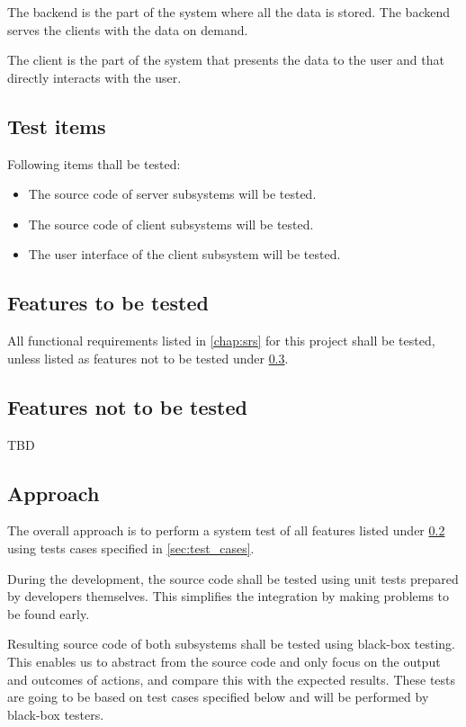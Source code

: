 \documentclass[11pt]{book}
\begin{document}
The backend is the part of the system where all the data is stored. The backend serves the clients with the data on demand.

The client is the part of the system that presents the data to the user and that directly interacts with the user.

\subsection{Test items}
Following items thall be tested:

\begin{itemize}
	\item The source code of server subsystems will be tested.
	\item The source code of client subsystems will be tested.
	\item The user interface of the client subsystem will be tested.
\end{itemize}

\subsection{Features to be tested} \label{sec:test_plan_featurestested}
All functional requirements listed in \ref{chap:srs} for this project shall be tested, unless listed as features not to be tested under \ref{sec:test_plan_featuresnottested}.

\subsection{Features not to be tested} \label{sec:test_plan_featuresnottested}
TBD

\subsection{Approach}
The overall approach is to perform a system test of all features listed under \ref{sec:test_plan_featurestested} using tests cases specified in \ref{sec:test_cases}.

During the development, the source code shall be tested using unit tests prepared by developers themselves. This simplifies the integration by making problems to be found early.

Resulting source code of both subsystems shall be tested using black-box testing. This enables us to abstract from the source code and only focus on the output and outcomes of actions, and compare this with the expected results. These tests are going to be based on test cases specified below and will be performed by black-box testers.
\end{document}
